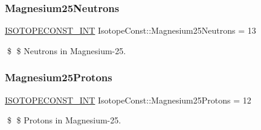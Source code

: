 \subsubsection{\texorpdfstring{Magnesium25\+Neutrons}{Magnesium25Neutrons}}
{\footnotesize\ttfamily \mbox{\hyperlink{group___isotope_const-_macros_ga5f18360b3e99483a35c32d789e62621c}{I\+S\+O\+T\+O\+P\+E\+C\+O\+N\+S\+T\+\_\+\+I\+NT}} Isotope\+Const\+::\+Magnesium25\+Neutrons = 13}

\$ \$ Neutrons in Magnesium-\/25. \mbox{\label{group___isotope_const-_magnesium-_mg25_gab54717d36d41671fed53a47846a74ac8}} 
\subsubsection{\texorpdfstring{Magnesium25\+Protons}{Magnesium25Protons}}
{\footnotesize\ttfamily \mbox{\hyperlink{group___isotope_const-_macros_ga5f18360b3e99483a35c32d789e62621c}{I\+S\+O\+T\+O\+P\+E\+C\+O\+N\+S\+T\+\_\+\+I\+NT}} Isotope\+Const\+::\+Magnesium25\+Protons = 12}

\$ \$ Protons in Magnesium-\/25. 